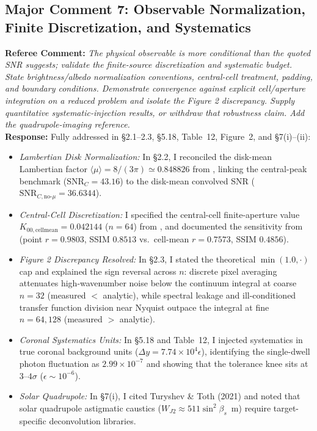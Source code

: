 \documentclass[11pt]{article}
\begin{document}
\subsection*{Major Comment 7: Observable Normalization, Finite Discretization, and Systematics}
\textbf{Referee Comment:} \textit{The physical observable is more conditional than the quoted SNR suggests; validate the finite-source discretization and systematic budget. State brightness/albedo normalization conventions, central-cell treatment, padding, and boundary conditions. Demonstrate convergence against explicit cell/aperture integration on a reduced problem and isolate the Figure 2 discrepancy. Supply quantitative systematic-injection results, or withdraw that robustness claim. Add the quadrupole-imaging reference.}\\
\textbf{Response:} Fully addressed in §2.1--2.3, §5.18, Table~12, Figure~2, and §7(i)--(ii):
\begin{itemize}
    \item \textit{Lambertian Disk Normalization:} In §2.2, I reconciled the disk-mean Lambertian factor $\langle\mu\rangle = 8/(3\pi) \simeq 0.848826$ from , linking the central-peak benchmark ($\mathrm{SNR}_C = 43.16$) to the disk-mean convolved SNR ($\mathrm{SNR}_{C,\mathrm{no}\text{-}\mu} = 36.6344$).
    \item \textit{Central-Cell Discretization:} I specified the central-cell finite-aperture value $K_{00,\mathrm{cellmean}} = 0.042144$ ($n=64$) from , and documented the sensitivity from  (point $r = 0.9803$, SSIM $0.8513$ vs.\ cell-mean $r = 0.7573$, SSIM $0.4856$).
    \item \textit{Figure 2 Discrepancy Resolved:} In §2.3, I stated the theoretical $\min(1.0, \cdot)$ cap and explained the sign reversal across $n$: discrete pixel averaging attenuates high-wavenumber noise below the continuum integral at coarse $n=32$ (measured $<$ analytic), while spectral leakage and ill-conditioned transfer function division near Nyquist outpace the integral at fine $n=64, 128$ (measured $>$ analytic).
    \item \textit{Coronal Systematics Units:} In §5.18 and Table~12, I injected systematics in true coronal background units ($\Delta y = 7.74\times 10^4 \epsilon$), identifying the single-dwell photon fluctuation as $2.99\times 10^{-7}$ and showing that the tolerance knee sits at $3$--$4\sigma$ ($\epsilon \sim 10^{-6}$).
    \item \textit{Solar Quadrupole:} In §7(i), I cited Turyshev \& Toth (2021) and noted that solar quadrupole astigmatic caustics ($W_{J2} \approx 511\sin^2\beta_s$~m) require target-specific deconvolution libraries.
\end{itemize}
\end{document}
